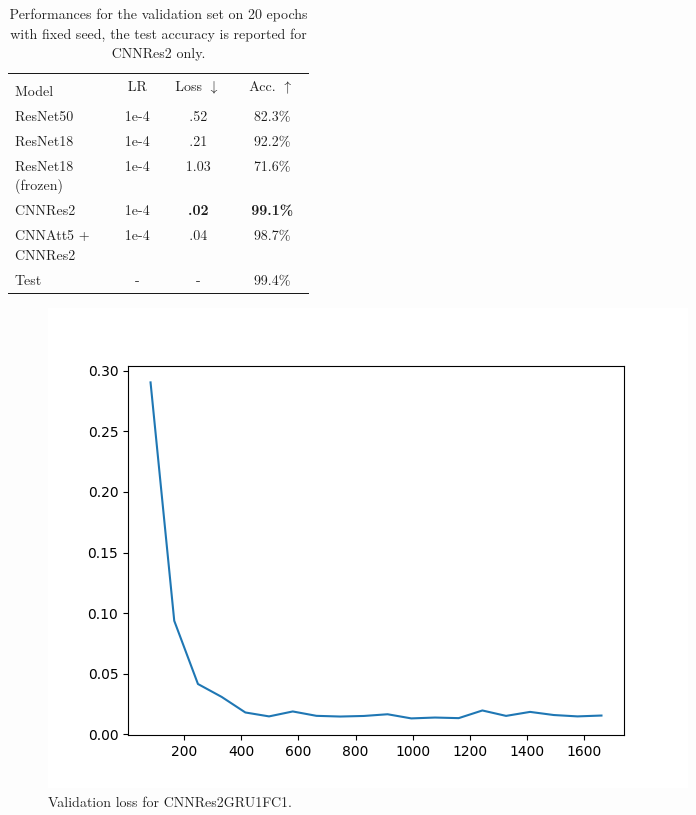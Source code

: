 \documentclass{article}
\begin{document}
\begin{table}[h!]
    \caption{Performances for the validation set on 20 epochs with fixed seed, the test accuracy is reported for CNNRes2 only.}
    \label{tab:joint-results}
    \begin{center}
        \begin{small}
            \begin{tabular}{p{0.35\linewidth} | ccc}
                \toprule
                & \multirow{2}{0.13\linewidth}{LR} 
                & \multirow{2}{0.13\linewidth}{Loss $\downarrow$} 
                & \multirow{2}{0.13\linewidth}{Acc. $\uparrow$} \\
                Model \\
                \midrule
                ResNet50 & 1e-4 & .52 & 82.3\% \\
                ResNet18 & 1e-4 & .21 & 92.2\% \\
                ResNet18 (frozen) & 1e-4 & 1.03 & 71.6\% \\
                CNNRes2 & 1e-4 & \textbf{.02} & \textbf{99.1\%} \\
                CNNAtt5 + CNNRes2 & 1e-4 & .04 & 98.7\% \\
                \midrule
                \midrule
                Test & - & - & 99.4\% \\
                \bottomrule
            \end{tabular}
        \end{small}
    \end{center}
    \vspace{-0.5cm}
\end{table}

\begin{figure}
    \centering
    \includegraphics[scale=.5]{images/val_loss.png}
    \caption{Validation loss for CNNRes2GRU1FC1.}
    \label{fig:val-loss}
\end{figure}
\end{document}
